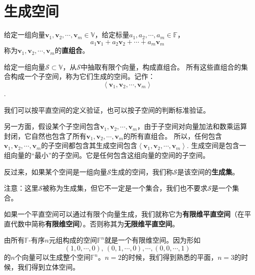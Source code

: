 \documentclass[12pt,UTF8]{ctexbook}
\begin{document}
\begin{center}
\end{center}

\section{生成空间}
\begin{df}\label{df2_1}
    给定一组向量$\mathbf{v}_1, \mathbf{v}_2 , \cdots , \mathbf{v}_m \in \mathbb{V}$，给定标量$a_1, a_2, \cdots, a_m\in \mathbb{F}$，
    $$a_1\mathbf{v}_1+a_2\mathbf{v}_2 + \cdots + a_m\mathbf{v}_m$$
    称为$\mathbf{v}_1, \mathbf{v}_2 , \cdots , \mathbf{v}_m$的\textbf{直组合}。
\end{df}

\begin{pp}\label{pp:2_1}
    给定一组向量$\mathcal{S} \subset \mathbb{V}$，从$\mathcal{S}$中抽取有限个向量，构成直组合。
    所有这些直组合的集合构成一个子空间，称为它们生成的空间。记作：
    $$ \left \langle \mathbf{v}_1, \mathbf{v}_2 , \cdots , \mathbf{v}_m \right \rangle$$.
\end{pp}
我们可以按平直空间的定义验证，也可以按子空间的判断标准验证。

另一方面，假设某个子空间包含$\mathbf{v}_1, \mathbf{v}_2 , \cdots , \mathbf{v}_m$，由于子空间对向量加法和数乘运算封闭，它自然也包含了所有$\mathbf{v}_1, \mathbf{v}_2 , \cdots , \mathbf{v}_m$的所有直组合。
所以，任何包含$\mathbf{v}_1, \mathbf{v}_2 , \cdots , \mathbf{v}_m$的子空间都包含其生成空间包含$\left\langle\mathbf{v}_1, \mathbf{v}_2 , \cdots , \mathbf{v}_m\right\rangle$. 
生成空间是包含一组向量的“最小”的子空间。它是任何包含这组向量的空间的子空间。

反过来，如果某个空间是一组向量$\mathcal{S}$生成的空间，我们称$\mathcal{S}$是该空间的\textbf{生成集}。

注意：这里$\mathcal{S}$被称为生成集，但它不一定是一个集合，我们也不要求$\mathcal{S}$是一个集合。

如果一个平直空间可以通过有限个向量生成，我们就称它为{\bfseries 有限维平直空间}（在平直代数中简称{\bfseries 有限维空间}）。否则称其为{\bfseries 无限维平直空间}。

由所有$\mathbb{F}$-有序$n$元组构成的空间$\mathbb{F}^n$就是一个有限维空间。因为形如
$$ (1,0,\cdots, 0), \, (0,1,\cdots,0),\cdots ,(0,0,\cdots,1)$$
的$n$个向量可以生成整个空间$\mathbb{F}^n$。$n=2$的时候，我们得到熟悉的平面，$n=3$的时候，我们得到立体空间。
\end{document}
